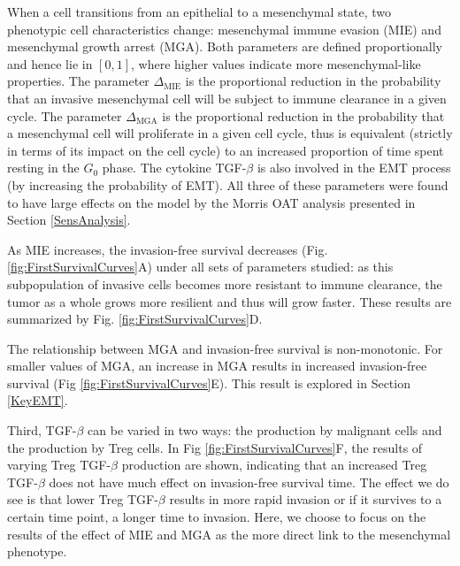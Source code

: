 \documentclass[11pt]{article}
\begin{document}
When a cell transitions from an epithelial to a mesenchymal state, two phenotypic cell characteristics change: mesenchymal immune evasion (MIE) and mesenchymal growth arrest (MGA).
Both parameters are defined proportionally and hence lie in $[0,1]$, where higher values indicate more mesenchymal-like properties.
The parameter $\Delta_\text{MIE}$ is the proportional reduction in the probability that an invasive mesenchymal cell will be subject to immune clearance in a given cycle.
The parameter $\Delta_\text{MGA}$ is the proportional reduction in the probability that a mesenchymal cell will proliferate in a given cell cycle, thus is equivalent (strictly in terms of its impact on the cell cycle) to an increased proportion of time spent resting in the $G_0$ phase.
The cytokine TGF-$\beta$ is also involved in the EMT process (by increasing the probability of EMT). All three of these parameters were found to have large effects on the model by the Morris OAT analysis presented in Section \ref{SensAnalysis}.
\par 
As MIE increases, the invasion-free survival decreases (Fig. \ref{fig:FirstSurvivalCurves}A) under all sets of parameters studied: as this subpopulation of invasive cells becomes more resistant to immune clearance, the tumor as a whole grows more resilient and thus will grow faster.
These results are summarized by Fig. \ref{fig:FirstSurvivalCurves}D.
\par
The relationship between MGA and invasion-free survival is non-monotonic.
For smaller values of MGA, an increase in MGA results in increased invasion-free survival (Fig \ref{fig:FirstSurvivalCurves}E).
This result is explored in Section \ref{KeyEMT}.
\par
Third, TGF-$\beta$ can be varied in two ways: the production by malignant cells and the production by Treg cells.
In Fig \ref{fig:FirstSurvivalCurves}F, the results of varying Treg TGF-$\beta$ production are shown, indicating that an increased Treg TGF-$\beta$ does not have much effect on invasion-free survival time.
The effect we do see is that lower Treg TGF-$\beta$ results in more rapid invasion or if it survives to a certain time point, a longer time to invasion.
Here, we choose to focus on the results of the effect of MIE and MGA as the more direct link to the mesenchymal phenotype.
\end{document}

